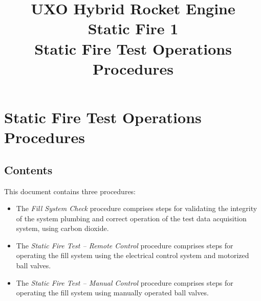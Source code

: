 

\title{
\Huge UXO Hybrid Rocket Engine\\
Static Fire 1\\
\vspace{1cm}
\Large Static Fire Test Operations Procedures}





\section{Static Fire Test Operations Procedures}

\subsection{Contents}
This document contains three procedures:
\begin{itemize}
    \item The \textit{Fill System Check} procedure comprises steps for validating the integrity of the system plumbing and correct operation of the test data acquisition system, using carbon dioxide.
    \item The \textit{Static Fire Test – Remote Control} procedure comprises steps for operating the fill system using the electrical control system and motorized ball valves.
    \item The \textit{Static Fire Test – Manual Control} procedure comprises steps for operating the fill system using manually operated ball valves.
\end{itemize}

